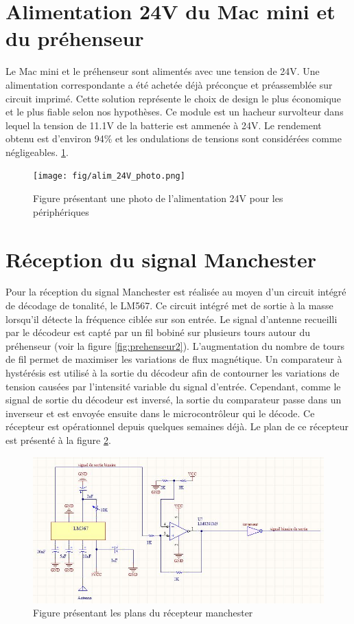 \section{Alimentation 24V du Mac mini et du préhenseur}
Le Mac mini et le préhenseur sont alimentés avec une tension de 24V. Une alimentation correspondante a été achetée déjà préconçue et préassemblée sur circuit imprimé. Cette solution représente le choix de design le plus économique et le plus fiable selon nos hypothèses. Ce module est un hacheur survolteur dans lequel la tension de 11.1V de la batterie est ammenée à 24V. Le rendement obtenu est d’environ 94\% et les ondulations de tensions sont considérées comme négligeables. \ref{fig:alim24Vphoto}.

\begin{figure}[htbp]
\centering
\texttt{[image: fig/alim\_24V\_photo.png]}
\caption{Figure présentant une photo de l'alimentation 24V pour les périphériques}
\label{fig:alim24Vphoto}
\end{figure}

\section{Réception du signal Manchester}
Pour la réception du signal Manchester est réalisée au moyen d'un circuit intégré de décodage de tonalité, le LM567. Ce circuit intégré met de sortie à la masse lorsqu’il détecte la fréquence ciblée sur son entrée. Le signal d'antenne recueilli par le décodeur est capté par un fil bobiné sur plusieurs tours autour du préhenseur (voir la figure \ref{fig:prehenseur2}). L'augmentation du nombre de tours de fil permet de maximiser les variations de flux magnétique.  Un comparateur à hystérésis est utilisé à la sortie du décodeur afin de contourner les variations de tension causées par l'intensité variable du signal d’entrée. Cependant, comme le signal de sortie du décodeur est inversé, la sortie du comparateur passe dans un inverseur et est envoyée ensuite dans le microcontrôleur qui le décode. Ce récepteur est opérationnel depuis quelques semaines déjà. Le plan de ce récepteur est présenté à la figure \ref{fig:manchester}.

\begin{figure}[htbp]
\centering
\includegraphics[scale=0.5]{fig/circuit_manchester.jpg}
\caption{Figure présentant les plans du récepteur manchester}
\label{fig:manchester}
\end{figure}

